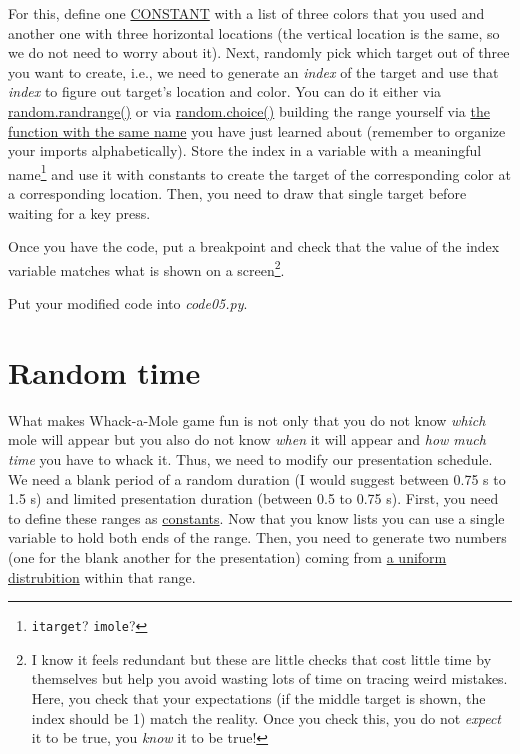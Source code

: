 \documentclass[
]{book}
\begin{document}
For this, define one \protect\hyperlink{constants}{CONSTANT} with a list of three colors that you used and another one with three horizontal locations (the vertical location is the same, so we do not need to worry about it). Next, randomly pick which target out of three you want to create, i.e., we need to generate an \emph{index} of the target and use that \emph{index} to figure out target's location and color. You can do it either via \href{https://docs.python.org/3/library/random.html\#random.randrange}{random.randrange()} or via \href{https://docs.python.org/3/library/random.html\#random.choice}{random.choice()} building the range yourself via \href{}{the function with the same name} you have just learned about (remember to organize your imports alphabetically). Store the index in a variable with a meaningful name\footnote{\texttt{itarget}? \texttt{imole}?} and use it with constants to create the target of the corresponding color at a corresponding location. Then, you need to draw that single target before waiting for a key press.

Once you have the code, put a breakpoint and check that the value of the index variable matches what is shown on a screen\footnote{I know it feels redundant but these are little checks that cost little time by themselves but help you avoid wasting lots of time on tracing weird mistakes. Here, you check that your expectations (if the middle target is shown, the index should be 1) match the reality. Once you check this, you do not \emph{expect} it to be true, you \emph{know} it to be true!}.

Put your modified code into \emph{code05.py}.

\hypertarget{clock-wait}{%
\section{Random time}\label{clock-wait}}

What makes Whack-a-Mole game fun is not only that you do not know \emph{which} mole will appear but you also do not know \emph{when} it will appear and \emph{how much time} you have to whack it. Thus, we need to modify our presentation schedule. We need a blank period of a random duration (I would suggest between 0.75 s to 1.5 s) and limited presentation duration (between 0.5 to 0.75 s). First, you need to define these ranges as \protect\hyperlink{constants}{constants}. Now that you know lists you can use a single variable to hold both ends of the range. Then, you need to generate two numbers (one for the blank another for the presentation) coming from \href{https://docs.python.org/3/library/random.html\#random.uniform}{a uniform distrubition} within that range.
\end{document}
